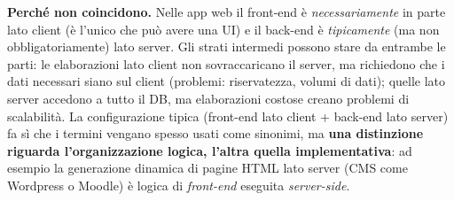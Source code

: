 \textbf{Perch\'e non coincidono.} Nelle app web il front-end \`e \emph{necessariamente} in
parte lato client (\`e l'unico che pu\`o avere una UI) e il back-end \`e \emph{tipicamente}
(ma non obbligatoriamente) lato server. Gli strati intermedi possono stare da entrambe le
parti: le elaborazioni lato client non sovraccaricano il server, ma richiedono che i dati
necessari siano sul client (problemi: riservatezza, volumi di dati); quelle lato server
accedono a tutto il DB, ma elaborazioni costose creano problemi di scalabilit\`a.
La configurazione tipica (front-end lato client + back-end lato server) fa s\`i che i termini
vengano spesso usati come sinonimi, ma \textbf{una distinzione riguarda l'organizzazione
logica, l'altra quella implementativa}: ad esempio la generazione dinamica di pagine HTML
lato server (CMS come Wordpress o Moodle) \`e logica di \emph{front-end} eseguita
\emph{server-side}.
